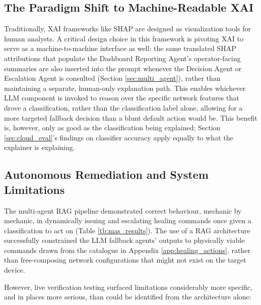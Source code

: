 \subsection{The Paradigm Shift to Machine-Readable XAI}
Traditionally, XAI frameworks like SHAP are designed as visualization tools for human analysts. A critical design choice in this framework is pivoting XAI to serve as a machine-to-machine interface as well: the same translated SHAP attributions that populate the Dashboard Reporting Agent's operator-facing summaries are also inserted into the prompt whenever the Decision Agent or Escalation Agent is consulted (Section \ref{sec:multi_agent}), rather than maintaining a separate, human-only explanation path. This enables whichever LLM component is invoked to reason over the specific network features that drove a classification, rather than the classification label alone, allowing for a more targeted fallback decision than a blunt default action would be. This benefit is, however, only as good as the classification being explained; Section \ref{sec:cloud_eval}'s findings on classifier accuracy apply equally to what the explainer is explaining.

\subsection{Autonomous Remediation and System Limitations}\label{sec:limitations_integration}
The multi-agent RAG pipeline demonstrated correct behaviour, mechanic by mechanic, in dynamically issuing and escalating healing commands once given a classification to act on (Table \ref{tb:mas_results}). The use of a RAG architecture successfully constrained the LLM fallback agents' outputs to physically viable commands drawn from the catalogue in Appendix \ref{app:healing_actions}, rather than free-composing network configurations that might not exist on the target device.

However, live verification testing surfaced limitations considerably more specific, and in places more serious, than could be identified from the architecture alone:

